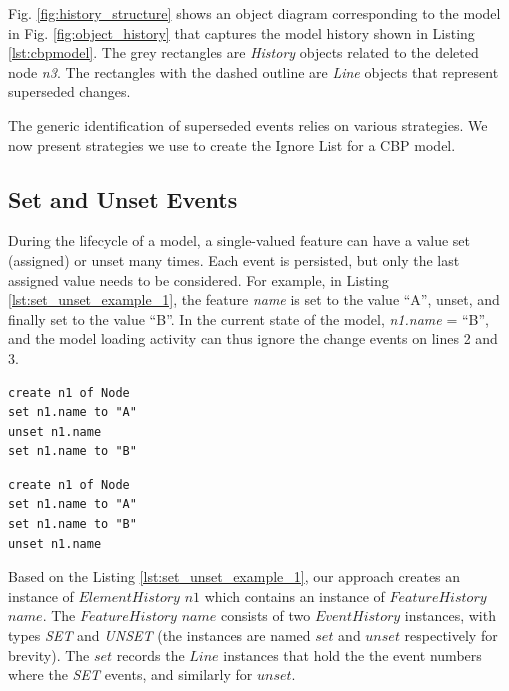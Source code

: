 \documentclass{llncs}
\begin{document}
    Fig. \ref{fig:history_structure} shows an object diagram corresponding to the model in Fig. \ref{fig:object_history} that captures the model history shown in Listing \ref{lst:cbpmodel}. The grey rectangles are \emph{History} objects related to the deleted node \emph{n3}. The rectangles with the dashed outline are \emph{Line} objects that represent superseded changes. 
      
    The generic identification of superseded events relies on various strategies.  We now present strategies we use to create the Ignore List for a CBP model. 

    \subsection{Set and Unset Events}
    \label{subsec:set_and_unset_operations}
    During the lifecycle of a model, a single-valued feature can have a value set (assigned) or unset many times.  Each event is persisted, but only the last assigned value needs to be considered. For example, in Listing \ref{lst:set_unset_example_1}, the feature \emph{name} is set to the value ``A'', unset, and finally set to the value ``B''.  In the current state of the model, \emph{n1.name} = ``B'', and the model loading activity can thus ignore the change events on lines 2 and 3. 
    
    \noindent
    \begin{minipage}[t]{0.49\linewidth}
\begin{lstlisting}[style=eol,caption={A CBP representation of attribute \emph{name} assignments.},label=lst:set_unset_example_1]
create n1 of Node
set n1.name to "A"
unset n1.name
set n1.name to "B"
\end{lstlisting}
    \end{minipage}
    \hfill
    \begin{minipage}[t]{0.49\linewidth}
\begin{lstlisting}[style=eol,caption={A CBP representation of attribute \emph{name} assignments.},label=lst:set_unset_example_2]
create n1 of Node
set n1.name to "A"
set n1.name to "B"
unset n1.name
\end{lstlisting}
    \end{minipage}
    
    Based on the Listing \ref{lst:set_unset_example_1}, our approach creates an instance of $ElementHistory$ $n1$ which contains an instance of $FeatureHistory$ $name$. The $FeatureHistory$ $name$ consists of two $EventHistory$ instances, with types \textit{SET} and \textit{UNSET} (the instances are named $set$ and $unset$ respectively for brevity). The $set$ records the $Line$ instances that hold the the event numbers where the \textit{SET} events, and similarly for $unset$.
    
\end{document}
